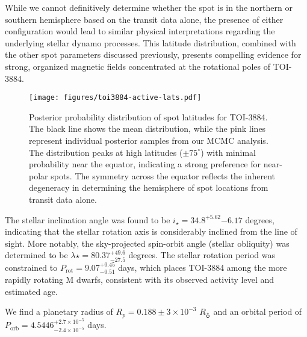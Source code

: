 \documentclass[twocolumn]{aastex631}
\begin{document}
While we cannot definitively determine whether the spot is in the northern or southern hemisphere based on the transit data alone, 
the presence of either configuration would lead to similar physical interpretations regarding the underlying stellar dynamo processes. 
This latitude distribution, combined with the other spot parameters discussed previously, presents compelling evidence for strong, 
organized magnetic fields concentrated at the rotational poles of TOI-3884.

\begin{figure*}[hbt!]
    \centering
    \texttt{[image: figures/toi3884-active-lats.pdf]}
    \caption{Posterior probability distribution of spot latitudes for TOI-3884. The black line shows the mean distribution, 
    while the pink lines represent individual posterior samples from our MCMC analysis. The distribution peaks at high latitudes 
    ($\pm75^{\circ}$) with minimal probability near the equator, indicating a strong preference for near-polar spots.
    The symmetry across 
    the equator reflects the inherent degeneracy in determining the hemisphere of spot locations from transit data alone.}
    \label{fig:spot_latitudes}
\end{figure*}

The stellar inclination angle was found to be $i_\star = {34.8}^{+5.62}{-6.17}$ degrees, indicating that the stellar rotation 
axis is considerably inclined from the line of sight. More notably, the sky-projected spin-orbit angle (stellar obliquity) was 
determined to be $\lambda\star = {80.37}^{+49.6}_{-27.5}$ degrees.
The stellar rotation period was constrained to $P_\text{rot} = 9.07^{+0.45}_{-0.51}$ days, which places TOI-3884 among the 
more rapidly rotating M dwarfs, consistent with its observed activity level and estimated age.

We find a planetary radius of $R_p = 0.188 \pm 3\times10^{-3}$ $R_\earth$ and an orbital period of 
$P_\text{orb} = 4.5446^{+2.7\times10^{-5}}_{-2.4\times10^{-5}}$ days. 
\end{document}
